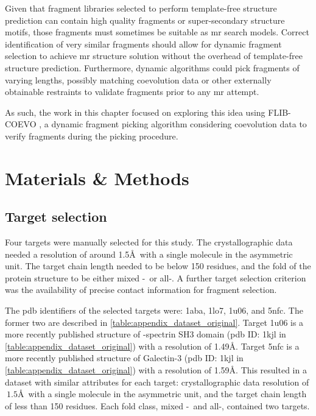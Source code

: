 Given that fragment libraries selected to perform template-free structure prediction can contain high quality fragments or super-secondary structure motifs, those fragments must sometimes be suitable as \gls{mr} search models. Correct identification of very similar fragments should allow for dynamic fragment selection to achieve \gls{mr} structure solution without the overhead of template-free structure prediction. Furthermore, dynamic algorithms could pick fragments of varying lengths, possibly matching coevolution data or other externally obtainable restraints to validate fragments prior to any \gls{mr} attempt. 

As such, the work in this chapter focused on exploring this idea using FLIB-COEVO \cite{De_Oliveira2018-za}, a dynamic fragment picking algorithm considering coevolution data to verify fragments during the picking procedure.

\section{Materials \& Methods}
\subsection{Target selection}
Four targets were manually selected for this study. The crystallographic data needed a resolution of around 1.5\AA\ with a single molecule in the asymmetric unit. The target chain length needed to be below 150 residues, and the fold of the protein structure to be either mixed \textalpha-\textbeta\ or all-\textbeta. A further target selection criterion was the availability of precise contact information for fragment selection.

The \gls{pdb} identifiers of the selected targets were: 1aba, 1lo7, 1u06, and 5nfc. The former two are described in \cref{table:appendix_dataset_original}. Target 1u06 is a more recently published structure of \textalpha-spectrin SH3 domain (\gls{pdb} ID: 1kjl in \cref{table:appendix_dataset_original}) with a resolution of 1.49\AA. Target 5nfc is a more recently published structure of Galectin-3 (\gls{pdb} ID: 1kjl in \cref{table:appendix_dataset_original}) with a resolution of 1.59\AA. This resulted in a dataset with similar attributes for each target: crystallographic data resolution of $~1.5$\AA\ with a single molecule in the asymmetric unit, and the target chain length of less than 150 residues. Each fold class, mixed \textalpha-\textbeta\ and all-\textbeta, contained two targets.

